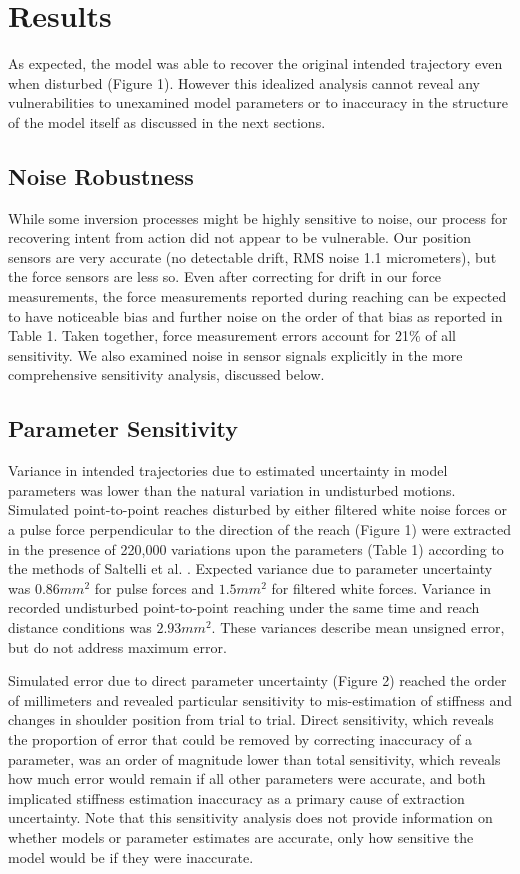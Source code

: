 \documentclass[10pt]{article}
\begin{document}

\section*{Results}
As expected, the model was able to recover the original intended trajectory even when disturbed (Figure 1). However this idealized analysis cannot reveal any vulnerabilities to unexamined model parameters or to inaccuracy in the structure of the model itself as discussed in the next sections.

\subsection*{Noise Robustness}
While some inversion processes might be highly sensitive to noise, our process for recovering intent from action did not appear to be vulnerable. Our position sensors are very accurate (no detectable drift, RMS noise 1.1 micrometers), but the force sensors are less so. Even after correcting for drift in our force measurements, the force measurements reported during reaching can be expected to have noticeable bias and further noise on the order of that bias as reported in Table 1. Taken together, force measurement errors account for 21\% of all sensitivity. We also examined noise in sensor signals explicitly in the more comprehensive  sensitivity analysis, discussed below.

\subsection*{Parameter Sensitivity}
Variance in intended trajectories due to estimated uncertainty in model parameters was lower than the natural variation in undisturbed motions. Simulated point-to-point reaches disturbed by either filtered white noise forces or a pulse force perpendicular to the direction of the reach (Figure 1) were extracted in the presence of 220,000 variations upon the parameters (Table 1) according to the methods of Saltelli et al. \cite{saltelli2010variance}. Expected variance due to parameter uncertainty was $0.86  mm^2$ for pulse forces and $1.5 mm^2$ for filtered white forces. Variance in recorded undisturbed point-to-point reaching under the same time and reach distance conditions was $2.93 mm^2$. These variances describe mean unsigned error, but do not address maximum error.

Simulated error due to direct parameter uncertainty (Figure 2) reached the order of millimeters and revealed particular sensitivity to mis-estimation of stiffness and changes in shoulder position from trial to trial. Direct sensitivity, which reveals the proportion of error that could be removed by correcting inaccuracy of a parameter, was an order of magnitude lower than total sensitivity, which reveals how much error would remain if all other parameters were accurate,  and both implicated stiffness estimation inaccuracy as a primary cause of extraction uncertainty. Note that this sensitivity analysis does not provide information on whether models or parameter estimates are accurate, only how sensitive the model would be if they were inaccurate. 
\end{document}
